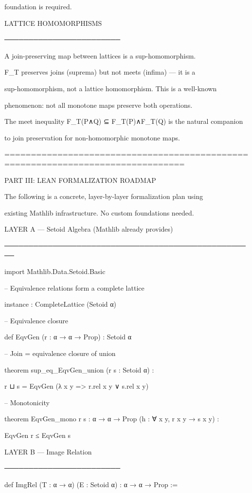 foundation is required.




LATTICE HOMOMORPHISMS

────────────────────────

A join-preserving map between lattices is a sup-homomorphism.

F_T preserves joins (suprema) but not meets (infima) — it is a

sup-homomorphism, not a lattice homomorphism. This is a well-known

phenomenon: not all monotone maps preserve both operations.




The meet inequality F_T(P∧Q) ⊆ F_T(P)∧F_T(Q) is the natural companion

to join preservation for non-homomorphic monotone maps.


================================================================================

PART III: LEAN FORMALIZATION ROADMAP


The following is a concrete, layer-by-layer formalization plan using

existing Mathlib infrastructure. No custom foundations needed.


LAYER A — Setoid Algebra (Mathlib already provides)

────────────────────────────────────────────────────

import Mathlib.Data.Setoid.Basic


-- Equivalence relations form a complete lattice

instance : CompleteLattice (Setoid α)


-- Equivalence closure

def EqvGen (r : α → α → Prop) : Setoid α


-- Join = equivalence closure of union

theorem sup_eq_EqvGen_union (r s : Setoid α) :

r ⊔ s = EqvGen (λ x y => r.rel x y ∨ s.rel x y)


-- Monotonicity

theorem EqvGen_mono {r s : α → α → Prop} (h : ∀ x y, r x y → s x y) :

EqvGen r ≤ EqvGen s


LAYER B — Image Relation

────────────────────────

def ImgRel (T : α → α) (E : Setoid α) : α → α → Prop :=

